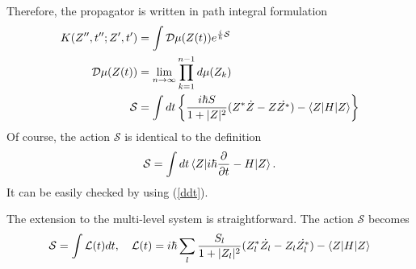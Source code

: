 \documentclass[11pt]{book} %
\begin{document}
Therefore, the propagator is written in path integral formulation
\begin{align}
    K(Z'',t'';Z',t') &= \int \mathcal{D}\mu(Z(t))e^{\frac{i}{\hbar}\mathcal{S}} \\
     \mathcal{D}\mu(Z(t)) &= \lim_{n \to \infty} \prod_{k=1}^{n-1}d\mu(Z_k) \\
    \mathcal{S} &= \int dt \left\{ \frac{i\hbar S}{1+|Z|^2}(Z^*\dot{Z}-Z\dot{Z^*})
    -\braket{Z|H|Z} \right\}
\end{align}
Of course, the action $\mathcal{S}$ is identical to the definition
\begin{align}
  \mathcal{S} = \int dt \braket{Z|i\hbar\frac{\partial}{\partial t}-H|Z} .
\end{align}
It can be easily checked by using (\ref{ddt}).

The extension to the multi-level system is straightforward. The action $\mathcal{S}$ becomes
\begin{equation}
  \mathcal{S} = \int \mathcal{L}(t) dt, \quad 
  \mathcal{L}(t) =i\hbar \sum_l \frac{S_l}{1+|Z_l|^2}
  (Z_l^*\dot{Z_l}-Z_l\dot{Z_l^*}) - \braket{Z|H|Z}
\end{equation}
\end{document}
